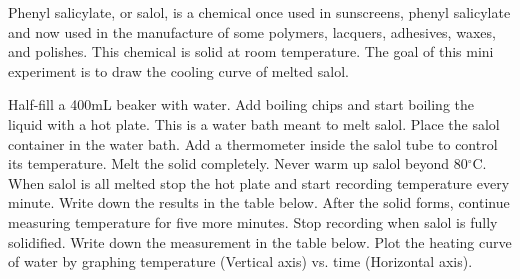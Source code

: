 \documentclass[main.tex]{subfiles}
\begin{document}
\vspace{0.2cm}{\large \bfseries 2. Cooling curve of salol}
Phenyl salicylate, or salol, is a chemical once used in sunscreens, phenyl salicylate and now used in the manufacture of some polymers, lacquers, adhesives, waxes, and polishes. This chemical is solid at room temperature. The goal of this mini experiment is to draw the cooling curve of melted salol.
\begin{steps}
    \newstep[] Half-fill a 400mL beaker with water. Add boiling chips and start boiling the liquid with a hot plate. This is a water bath meant to melt salol.
        \newstep[]  Place the salol container in the water bath. Add a thermometer inside the salol tube to control its temperature. Melt the solid completely. Never warm up salol beyond 80$^\circ$C.
        \newstep[]  When salol is all melted stop the hot plate and start recording temperature every minute. Write down the results in the table below.
  \newstep[] After the solid forms, continue measuring temperature for five more minutes.
  \newstep[] Stop recording when salol is fully solidified.
      \newstep[] Write down the measurement in the table below. 
      \newstep[] Plot the heating curve of water by graphing temperature (Vertical axis) vs. time (Horizontal axis).
\end{steps}


 
\end{document}
